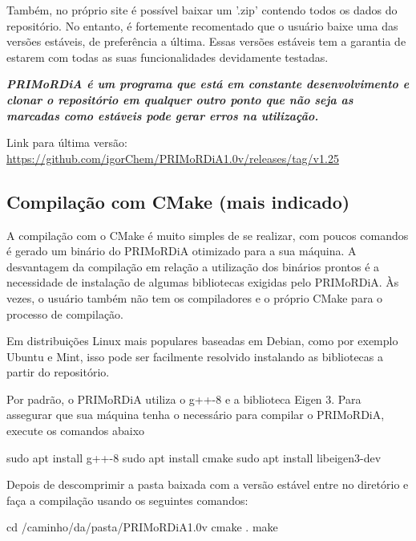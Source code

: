 \documentclass[a4paper,11pt]{refart}
\begin{document}
Também, no próprio site é possível baixar um '.zip' contendo todos os dados do repositório. 
No entanto, é fortemente recomentado que o usuário baixe uma das versões estáveis, de preferência a última. Essas versões estáveis tem a garantia de estarem com todas as suas funcionalidades devidamente testadas. 

\emph{\textbf{PRIMoRDiA é um programa que está em constante desenvolvimento e clonar o repositório em qualquer outro ponto que não seja as marcadas como estáveis pode gerar erros na utilização. }}

Link para última versão: \url{https://github.com/igorChem/PRIMoRDiA1.0v/releases/tag/v1.25}

\subsection{ Compilação com CMake (mais indicado) }

A compilação com o CMake é muito simples de se realizar, com poucos comandos é gerado um binário do PRIMoRDiA otimizado para a sua máquina. A desvantagem da compilação em relação a utilização dos binários prontos é a necessidade de instalação de algumas bibliotecas exigidas pelo PRIMoRDiA. Às vezes, o usuário também não tem os compiladores e o próprio CMake para o processo de compilação. 

Em distribuições Linux mais populares baseadas em Debian, como por exemplo Ubuntu e Mint, isso pode ser facilmente resolvido instalando as bibliotecas a partir do repositório.

Por padrão, o PRIMoRDiA utiliza o g++-8 e a biblioteca Eigen 3. Para assegurar que sua máquina tenha o necessário para compilar o PRIMoRDiA, execute os comandos abaixo

\hspace*{-\leftmarginwidth}
\begin{minipage}{\fullwidth}
\begin{commandshell}
sudo apt install g++-8 
sudo apt install cmake
sudo apt install libeigen3-dev
\end{commandshell}
\end{minipage}
 
Depois de descomprimir a pasta baixada com a versão estável entre no diretório e faça a compilação usando os seguintes comandos: 

\hspace*{-\leftmarginwidth}
\begin{minipage}{\fullwidth}
\begin{commandshell}cd /caminho/da/pasta/PRIMoRDiA1.0v
cmake .
make
\end{commandshell}
\end{minipage}
\end{document}
